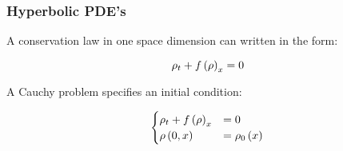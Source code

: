 \begin{frame}
\frametitle{Hyperbolic PDE's}
A conservation law in one space dimension can written in the form:

\begin{equation}
\rho_{t}+f\left(\rho\right)_{x} =0
\end{equation}

A Cauchy problem specifies an initial condition:

\begin{equation}
\begin{cases}
\rho_{t}+f\left(\rho\right)_{x} & =0\\
\rho\left(0,x\right) & =\rho_{0}\left(x\right)
\end{cases}
\end{equation}
\end{frame}